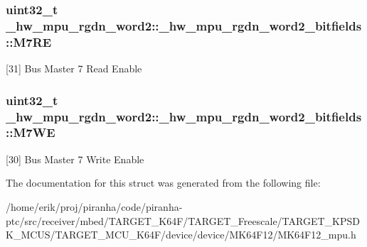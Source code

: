 \subsubsection[{\texorpdfstring{M7\+RE}{M7RE}}]{\setlength{\rightskip}{0pt plus 5cm}uint32\+\_\+t \+\_\+hw\+\_\+mpu\+\_\+rgdn\+\_\+word2\+::\+\_\+hw\+\_\+mpu\+\_\+rgdn\+\_\+word2\+\_\+bitfields\+::\+M7\+RE}\hypertarget{struct__hw__mpu__rgdn__word2_1_1__hw__mpu__rgdn__word2__bitfields_a6994265336bd5a387da0f7e20e1954d6}{}\label{struct__hw__mpu__rgdn__word2_1_1__hw__mpu__rgdn__word2__bitfields_a6994265336bd5a387da0f7e20e1954d6}
\mbox{[}31\mbox{]} Bus Master 7 Read Enable 
\subsubsection[{\texorpdfstring{M7\+WE}{M7WE}}]{\setlength{\rightskip}{0pt plus 5cm}uint32\+\_\+t \+\_\+hw\+\_\+mpu\+\_\+rgdn\+\_\+word2\+::\+\_\+hw\+\_\+mpu\+\_\+rgdn\+\_\+word2\+\_\+bitfields\+::\+M7\+WE}\hypertarget{struct__hw__mpu__rgdn__word2_1_1__hw__mpu__rgdn__word2__bitfields_a438d6131183b0453b882d29c97a37b92}{}\label{struct__hw__mpu__rgdn__word2_1_1__hw__mpu__rgdn__word2__bitfields_a438d6131183b0453b882d29c97a37b92}
\mbox{[}30\mbox{]} Bus Master 7 Write Enable 

The documentation for this struct was generated from the following file\+:\begin{DoxyCompactItemize}
\item 
/home/erik/proj/piranha/code/piranha-\/ptc/src/receiver/mbed/\+T\+A\+R\+G\+E\+T\+\_\+\+K64\+F/\+T\+A\+R\+G\+E\+T\+\_\+\+Freescale/\+T\+A\+R\+G\+E\+T\+\_\+\+K\+P\+S\+D\+K\+\_\+\+M\+C\+U\+S/\+T\+A\+R\+G\+E\+T\+\_\+\+M\+C\+U\+\_\+\+K64\+F/device/device/\+M\+K64\+F12/M\+K64\+F12\+\_\+mpu.\+h\end{DoxyCompactItemize}
